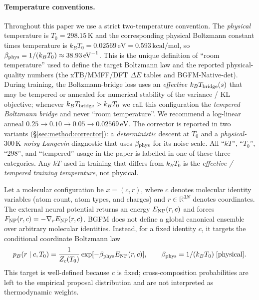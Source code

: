 \documentclass{article}
\begin{document}
\paragraph{Temperature conventions.}
Throughout this paper we use a strict two-temperature convention.
The \emph{physical} temperature is $T_0 = 298.15\,\mathrm{K}$ and the
corresponding physical Boltzmann constant times temperature is
$k_B T_0 = 0.02569\,\mathrm{eV} = 0.593\,\mathrm{kcal/mol}$,
so $\beta_{\rm phys} = 1/(k_B T_0) \approx 38.93\,\mathrm{eV}^{-1}$.
This is the unique definition of ``room temperature'' used to define the
target Boltzmann law and the reported physical-quality numbers (the
xTB/MMFF/DFT $\Delta E$ tables and BGFM-Native-det).
During training, the Boltzmann-bridge loss uses an \emph{effective}
$k_B T_{\rm bridge}(s)$ that may be tempered or annealed for numerical
stability of the variance / KL objective; whenever
$k_B T_{\rm bridge} > k_B T_0$ we call this configuration the
\emph{tempered Boltzmann bridge} and never ``room temperature''. We
recommend a log-linear anneal $0.25 \to 0.10 \to 0.05 \to 0.02569\,\mathrm{eV}$.
The corrector is reported in two variants (\S\ref{sec:method:corrector}):
a \emph{deterministic} descent at $T_0$ and a \emph{physical-$300\,\mathrm{K}$
noisy Langevin} diagnostic that uses $\beta_{\rm phys}$ for its noise scale.
All ``$kT$'', ``$T_0$'', ``$298$'', and ``tempered'' usage in the paper is
labelled in one of these three categories. Any $kT$ used in training that
differs from $k_B T_0$ is the \emph{effective / tempered training
temperature}, not physical.

Let a molecular configuration be $x=(c,r)$, where $c$ denotes molecular
identity variables (atom count, atom types, and charges) and
$r\in\mathbb R^{3N}$ denotes coordinates. The external neural potential
returns an energy $E_{\rm NP}(r,c)$ and forces
$F_{\rm NP}(r,c)=-\nabla_r E_{\rm NP}(r,c)$. BGFM does not define a
global canonical ensemble over arbitrary molecular identities. Instead,
for a fixed identity $c$, it targets the conditional coordinate
Boltzmann law
\begin{equation}
    p_B(r\mid c,T_0)=\frac{1}{Z_c(T_0)}\exp[-\beta_{\rm phys} E_{\rm NP}(r,c)],
    \qquad \beta_{\rm phys}=1/(k_B T_0)\;[\text{physical}].
    \label{eq:conditional-boltzmann}
\end{equation}
This target is well-defined because $c$ is fixed; cross-composition
probabilities are left to the empirical proposal distribution and are
not interpreted as thermodynamic weights.
\end{document}
